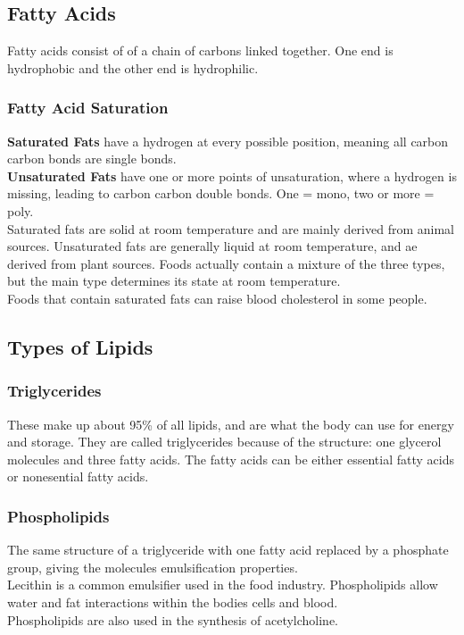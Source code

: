 \documentclass[letterpaper, 11pt]{article}
\begin{document}
\subsection{Fatty Acids}
\label{sec:org49d7863}
Fatty acids consist of of a chain of carbons linked together. One end is hydrophobic and the other end is hydrophilic.\\
\subsubsection{Fatty Acid Saturation}
\label{sec:orgef85aa8}
\textbf{Saturated Fats} have a hydrogen at every possible position, meaning all carbon carbon bonds are single bonds.\\
\textbf{Unsaturated Fats} have one or more points of unsaturation, where a hydrogen is missing, leading to carbon carbon double bonds. One = mono, two or more = poly.\\
Saturated fats are solid at room temperature and are mainly derived from animal sources. Unsaturated fats are generally liquid at room temperature, and ae derived from plant sources. Foods actually contain a mixture of the three types, but the main type determines its state at room temperature.\\
Foods that contain saturated fats can raise blood cholesterol in some people.\\
\subsection{Types of Lipids}
\label{sec:org4fdf126}
\subsubsection{Triglycerides}
\label{sec:orgc726447}
These make up about 95\% of all lipids, and are what the body can use for energy and storage. They are called triglycerides because of the structure: one glycerol molecules and three fatty acids. The fatty acids can be either essential fatty acids or nonesential fatty acids.\\
\subsubsection{Phospholipids}
\label{sec:org69c6782}
The same structure of a triglyceride with one fatty acid replaced by a phosphate group, giving the molecules emulsification properties.\\
Lecithin is a common emulsifier used in the food industry. Phospholipids allow water and fat interactions within the bodies cells and blood.\\
Phospholipids are also used in the synthesis of acetylcholine.\\
\end{document}
